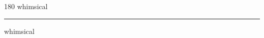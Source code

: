 
\begin{frame}
\begin{center}
\begin{turn}{180}
{\fontsize{2.5cm}{1em}\selectfont whimsical}
\end{turn}
\vspace{1em}\par  
\hrule
\vspace{1em}\par  
{\fontsize{2.5cm}{1em}\selectfont whimsical}
\end{center}
\end{frame}
